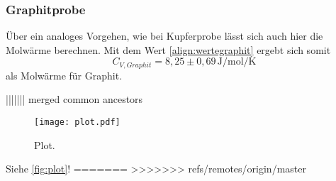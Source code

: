 \subsubsection{Graphitprobe}
Über ein analoges Vorgehen, wie bei Kupferprobe lässt sich auch hier die Molwärme berechnen. Mit dem Wert
\ref{align:wertegraphit} ergebt sich somit 
\begin{equation}
    C_{V,Graphit} = 8,25 \pm 0,69\, \si{\joule\per\mole\per\kelvin}
\end{equation}
als Molwärme für Graphit.



||||||| merged common ancestors

\begin{figure}
  \centering
  \texttt{[image: plot.pdf]}
  \caption{Plot.}
  \label{fig:plot}
\end{figure}


Siehe \autoref{fig:plot}!
=======
>>>>>>> refs/remotes/origin/master
